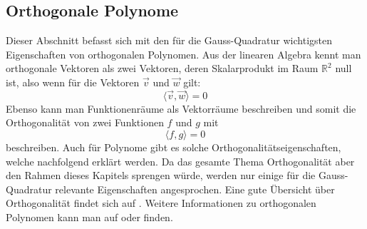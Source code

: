 \subsection{Orthogonale Polynome
\label{quadratur:subsection:orthogonalepolynome}}
Dieser Abschnitt befasst sich mit den für die Gauss-Quadratur wichtigsten 
Eigenschaften von orthogonalen Polynomen. 
Aus der linearen Algebra kennt man orthogonale Vektoren als
zwei Vektoren, deren Skalarprodukt im Raum $\mathbb{R}^{2}$ null ist,
also wenn für die Vektoren $\vec{v}$ und $\vec{w}$ gilt:
\begin{equation}
    \langle \vec{v}, \vec{w} \rangle = 0
\end{equation}
Ebenso kann man Funktionenräume als Vektorräume beschreiben und somit
die Orthogonalität von zwei Funktionen $f$ und $g$ mit
\begin{equation}
    \langle f, g \rangle = 0
\end{equation}
beschreiben.
Auch für Polynome gibt es solche Orthogonalitätseigenschaften, 
welche nachfolgend erklärt werden. 
Da das gesamte Thema Orthogonalität aber den Rahmen dieses Kapitels 
sprengen würde, 
werden nur einige für die Gauss-Quadratur relevante Eigenschaften
angesprochen. 
Eine gute Übersicht über Orthogonalität findet sich auf \cite{quadratur:wikipedia-orthogonality}.
Weitere Informationen zu orthogonalen Polynomen kann man auf 
\cite{quadratur:mathworld-orthogonal-polynomials}
oder 
\cite{quadratur:wikipedia-orthogonale-polynome} 
finden.

